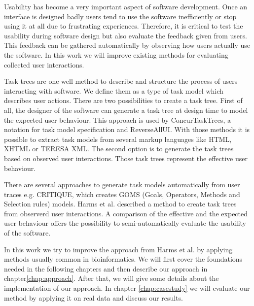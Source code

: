 Usability has become a very important aspect of software development. 
Once an interface is designed badly users tend to use the software inefficiently or stop using it at all due to frustrating experiences.
Therefore, it is critical to test the usability during software design but also evaluate the feedback given from users. 
This feedback can be gathered automatically by observing how users actually use the software.
In this work we will improve existing methods for evaluating collected user interactions.

Task trees are one well method to describe and structure the process of users interacting with software. 
We define them as a type of task model which describes user actions. 
There are two possibilities to create a task tree.
First of all, the designer of the software can generate a task tree at design time to model the expected user behaviour\cite{harms2013}.
This approach is used by ConcurTaskTrees\cite{paterno2003}, a notation for task model specification and ReverseAllUI\cite{bandelloni2008}. 
With those methods it is possible to extract task models from several markup languages like HTML, XHTML or TERESA XML.
The second option is to generate the task trees based on observed user interactions. 
Those task trees represent the effective user behaviour. 

There are several approaches to generate task models automatically from user traces e.g. CRITIQUE\cite{Hudson1999}, which creates GOMS (Goals, Operators, Methods and Selection rules) models.
Harms et al. described a method to create task trees from observerd user interactions\cite{harms2013}.
A comparison of the effective and the expected user behaviour offers the possibility to semi-automatically evaluate the usability of the software.  

In this work we try to improve the approach from Harms et al. by applying methods usually common in bioinformatics. 
We will first cover the foundations needed in the following chapters and then describe our approach in chapter\ref{chap:approach}. 
After that, we will give some details about the implementation of our approach. 
In chapter \ref{chap:casestudy} we will evaluate our method by applying it on real data and discuss our results.

